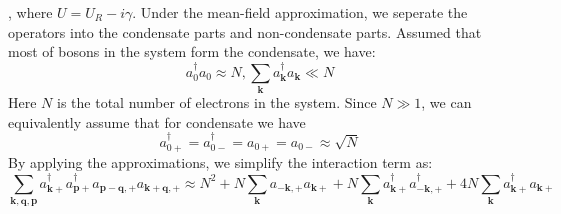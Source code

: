 \documentclass{article}
\newcommand{\tmmathbf}[1]{\ensuremath{\boldsymbol{#1}}}
\begin{document}
, where $U = U_R - i \gamma$. Under the mean-field approximation, we seperate
the operators into the condensate parts and non-condensate parts. Assumed that
most of bosons in the system form the condensate, we have:
\begin{equation}
  a_0^{\dagger} a_0 \approx N, \sum_{\tmmathbf{k}} a_{\tmmathbf{k}}^{\dagger}
  a_{\tmmathbf{k}} \ll N
\end{equation}
Here $N$ is the total number of electrons in the system. Since $N \gg 1$, we
can equivalently assume that for condensate we have
\begin{equation}
  a_{0 +}^{\dagger} = a_{0 -}^{\dagger} = a_{0 +} = a_{0 -} \approx \sqrt{N}
\end{equation}
By applying the approximations, we simplify the interaction term as:
\begin{equation}
  \sum_{\tmmathbf{k}, \tmmathbf{q}, \tmmathbf{p}} a_{\tmmathbf{k}+}^{\dagger}
  a_{\tmmathbf{p}+}^{\dagger} a_{\tmmathbf{p}-\tmmathbf{q}, +}
  a_{\tmmathbf{k}+\tmmathbf{q}, +} \approx N^2 + N \sum_{\tmmathbf{k}}
  a_{-\tmmathbf{k}, +} a_{\tmmathbf{k}+} + N \sum_{\tmmathbf{k}}
  a_{\tmmathbf{k}+}^{\dagger} a_{-\tmmathbf{k}, +}^{\dagger} + 4 N
  \sum_{\tmmathbf{k}} a_{\tmmathbf{k}+}^{\dagger} a_{\tmmathbf{k}+}
  \label{mean1}
\end{equation}
\end{document}
